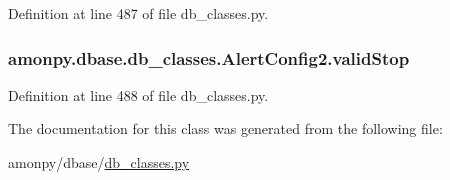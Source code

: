 Definition at line 487 of file db\-\_\-classes.\-py.

\hypertarget{classamonpy_1_1dbase_1_1db__classes_1_1_alert_config2_a0338a9f4188da7e5b4e977a6d6a32dff}{
\subsubsection[{valid\-Stop}]{\setlength{\rightskip}{0pt plus 5cm}amonpy.\-dbase.\-db\-\_\-classes.\-Alert\-Config2.\-valid\-Stop}}\label{classamonpy_1_1dbase_1_1db__classes_1_1_alert_config2_a0338a9f4188da7e5b4e977a6d6a32dff}


Definition at line 488 of file db\-\_\-classes.\-py.



The documentation for this class was generated from the following file\-:\begin{DoxyCompactItemize}
\item 
amonpy/dbase/\hyperlink{db__classes_8py}{db\-\_\-classes.\-py}\end{DoxyCompactItemize}

